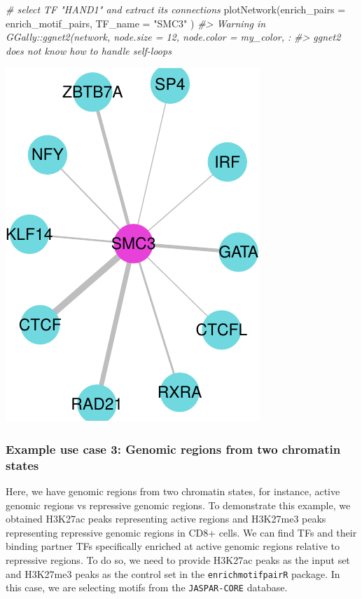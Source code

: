 \documentclass[
]{article}
\newenvironment{Shaded}{}{}
\newcommand{\AttributeTok}[1]{\textcolor[rgb]{0.49,0.56,0.16}{#1}}
\newcommand{\CommentTok}[1]{\textcolor[rgb]{0.38,0.63,0.69}{\textit{#1}}}
\newcommand{\FunctionTok}[1]{\textcolor[rgb]{0.02,0.16,0.49}{#1}}
\newcommand{\NormalTok}[1]{#1}
\newcommand{\StringTok}[1]{\textcolor[rgb]{0.25,0.44,0.63}{#1}}
\begin{document}
\begin{Shaded}
\begin{Highlighting}[]

\CommentTok{\# select TF "HAND1" and extract its connections}
\FunctionTok{plotNetwork}\NormalTok{(}\AttributeTok{enrich\_pairs =}\NormalTok{ enrich\_motif\_pairs,}
            \AttributeTok{TF\_name =} \StringTok{"SMC3"}
\NormalTok{            )}
\CommentTok{\#\textgreater{} Warning in GGally::ggnet2(network, node.size = 12, node.color = my\_color, :}
\CommentTok{\#\textgreater{} ggnet2 does not know how to handle self{-}loops}
\end{Highlighting}
\end{Shaded}

\includegraphics{enrichmotifpairR_user_manual_guide_files/figure-latex/Th1_vs_Th0_6-2.pdf}

\hypertarget{example-use-case-3-genomic-regions-from-two-chromatin-states}{%
\subsubsection{Example use case 3: Genomic regions from two chromatin
states}\label{example-use-case-3-genomic-regions-from-two-chromatin-states}}

Here, we have genomic regions from two chromatin states, for instance,
active genomic regions vs repressive genomic regions. To demonstrate
this example, we obtained H3K27ac peaks representing active regions and
H3K27me3 peaks representing repressive genomic regions in CD8+ cells. We
can find TFs and their binding partner TFs specifically enriched at
active genomic regions relative to repressive regions. To do so, we need
to provide H3K27ac peaks as the input set and H3K27me3 peaks as the
control set in the \texttt{enrichmotifpairR} package. In this case, we
are selecting motifs from the \texttt{JASPAR-CORE} database.
\end{document}
